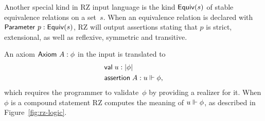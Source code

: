 Another special kind in RZ input language is the kind $\mathsf{Equiv}(s)$ of
stable equivalence relations on a set~$s$. When an equivalence
relation is declared with $\mathsf{Parameter}\ p : \mathsf{Equiv}(s)$, RZ will output
assertions stating that $p$ is strict, extensional, as well as
reflexive, symmetric and transitive.

An axiom $\mathsf{Axiom}\ A : \phi$ in the input is translated to
%
\begin{align*}
  & \mathsf{val}\;u:|\phi| \\
  & \mathsf{assertion}\; A : u \Vdash \phi,
\end{align*}
%
which requires the programmer to validate~$\phi$ by providing a
realizer for it. When $\phi$ is a compound statement RZ computes the
meaning of $u \Vdash \phi$, as described in Figure~\ref{fig:rz-logic}.



